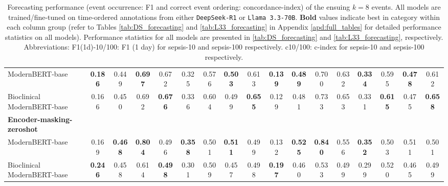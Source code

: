 \begin{table}[!htbp]
{\begin{tabular}{lcccccccc|cccccccc}
ModernBERT-base & \textbf{0.186} & 0.449 & \textbf{0.697} & 0.672 & 0.325 & 0.576 & \textbf{0.503} & 0.613 & \textbf{0.139} & \textbf{0.489} & 0.700 & 0.632 & \textbf{0.334} & 0.595 & \textbf{0.478} & 0.612 \\
Bioclinical ModernBERT-base & 0.166 & 0.450 & 0.692 & \textbf{0.676} & 0.336 & 0.604 & 0.499 & \textbf{0.655} & 0.129 & 0.481 & 0.733 & 0.653 & 0.331 & \textbf{0.615} & 0.475 & \textbf{0.658} \\ 
\hline
\textbf{Encoder-masking-zeroshot} &&&&&&&&&&&&&&&&\\
ModernBERT-base & 0.169 & \textbf{0.468} & \textbf{0.804} & 0.496 & \textbf{0.358} & 0.501 & \textbf{0.511} & 0.499 & 0.132 & \textbf{0.525} & \textbf{0.840} & 0.556 & \textbf{0.352} & 0.503 & 0.511 & 0.501 \\
Bioclinical ModernBERT-base & \textbf{0.246} & 0.458 & 0.614 & \textbf{0.498} & 0.301 & 0.509 & 0.457 & 0.498 & \textbf{0.197} & 0.460 & 0.533 & 0.499 & 0.299 & 0.520 & 0.465 & 0.499 \\
\bottomrule
\end{tabular}
}
\caption{Forecasting performance (event occurrence: F1 and correct event ordering: concordance-index) of the ensuing $k=8$ events. All models are trained/fine-tuned on time-ordered annotations from either \texttt{DeepSeek-R1} or \texttt{Llama 3.3-70B}. \textbf{Bold} values indicate best in category within each column group (refer to Tables \ref{tab:DS_forecasting} and \ref{tab:L33_forecasting} in Appendix \ref{apd:full_tables} for detailed performance statistics on all models). Performance statistics for all models are presented in \ref{tab:DS_forecasting} and \ref{tab:L33_forecasting}, respectively. Abbreviations: F1(1d)-10/100: F1 (1 day) for sepsis-10 and sepsis-100 respectively. c10/100: c-index for sepsis-10 and sepsis-100 respectively.
}
\label{tab:forecasting_clean_combined}
\end{table}
